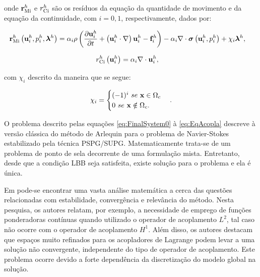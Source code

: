 \documentclass[tese_patricia]{subfiles}
\begin{document}
\noindent onde $\mathbf{r}_{\mathrm{Mi}}^{h}$ e ${r_{\mathrm{Ci}}^{h}}$ são os resíduos da equação da quantidade de movimento e da equação da continuidade, com $i=0,1$, respectivamente, dados por:

\begin{align}
	\mathbf{r}_{\mathrm{Mi}}^{h} \left(\mathbf{u}_i^{h},p_i^{h},\boldsymbol{\lambda}^h \right)&=\alpha_{i} \rho\left(\frac{\partial\mathbf{u}_i^{h}}{\partial t}+ \left( \mathbf{u}_i^{h} \cdot \nabla \right) \mathbf{u}_i^{h} - \mathbf{f}_i^{h}\right) - \alpha_{i} \nabla \cdot \boldsymbol{\sigma}\left(\mathbf{u}_i^{h},p_i^{h}\right)+ \chi_{i} \boldsymbol{\lambda}^h \label{eq:resMomI},
\end{align}

\noindent

\begin{align}
	r_{\mathrm{Ci}}^{h}\left(\mathbf{u}_i^{h}\right)&= \alpha_{i} \nabla \cdot \mathbf{u}_i^{h} \label{eq:resPreI}, 
\end{align}

\noindent com $\chi_{i}$ descrito da maneira que se segue:


\begin{align}
	\chi_{i} = \begin{cases} (-1)^{i} \ se \ \mathbf{x} \in \Omega_{c} \\
			   0 \ se \ \mathbf{x} \notin \Omega_{c}. \end{cases}						. 
\end{align}

O problema descrito pelas equações \ref{eq:FinalSystem0} à \ref{eq:EqAcopla} descreve à versão clássica do método de Arlequin para o problema de Navier-Stokes estabilizado pela técnica PSPG/SUPG. Matematicamente trata-se de um problema de ponto de sela decorrente de uma formulação mista. Entretanto, desde que a condição LBB seja satisfeita, existe solução para o problema e ela é única. 

Em  pode-se encontrar uma vasta análise matemática a cerca das questões relacionadas com estabilidade, convergência e relevância do método. Nesta pesquisa, os autores relatam, por exemplo, a necessidade de emprego de funções ponderadoras contínuas quando utilizado o operador de acoplamento $L^{2}$, tal caso não ocorre com o operador de acoplamento $H^{1}$. Além disso,  os autores destacam que espaços muito refinados para os acopladores de Lagrange podem levar a uma solução não convergente, independente do tipo de operador de acoplamento. Este problema ocorre devido a forte dependência da discretização do modelo global na solução.
\end{document}

